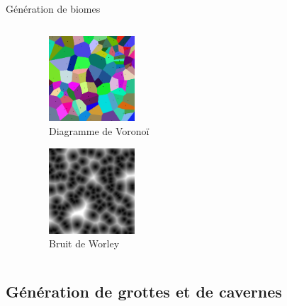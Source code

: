 \documentclass[aspectratio=169]{beamer}
\begin{document}
\begin{frame}{Génération de biomes}
    \begin{columns}
        \centering
        \begin{column}{0.5\textwidth}
            \centering
            \lipsum[1][1-5]
        \end{column}
        \begin{column}{0.5\textwidth}
            \centering
            \begin{figure}
                \centering
                \captionsetup{format=sanslabel}
                \includegraphics[width=0.3\textwidth]{assets/voronoi.png}
                \caption{Diagramme de Voronoï}
            \end{figure}
            \begin{figure}
                \centering
                \captionsetup{format=sanslabel}
                \includegraphics[width=0.3\textwidth]{assets/Worley.jpg}
                \caption{Bruit de Worley}
            \end{figure}
        \end{column}
    \end{columns}
\end{frame}

\subsection{Génération de grottes et de cavernes}
\end{document}
